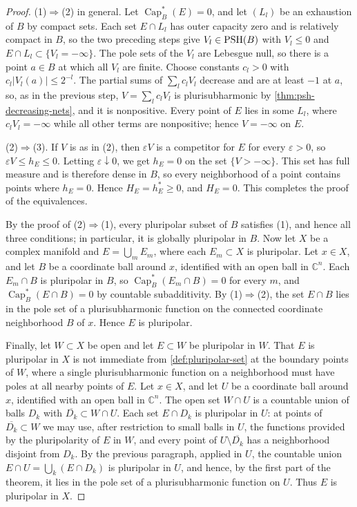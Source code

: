 \begin{proof}
(1)$\Rightarrow$(2) in general. Let $\operatorname{Cap}_B^*(E)=0$, and let $(L_l)$ be an exhaustion of $B$ by compact sets. Each set $E\cap L_l$ has outer capacity zero and is relatively compact in $B$, so the two preceding steps give $V_l\in\mathrm{PSH}(B)$ with $V_l\le0$ and $E\cap L_l\subset\{V_l=-\infty\}$. The pole sets of the $V_l$ are Lebesgue null, so there is a point $a\in B$ at which all $V_l$ are finite. Choose constants $c_l>0$ with $c_l|V_l(a)|\le2^{-l}$. The partial sums of $\sum_lc_lV_l$ decrease and are at least $-1$ at $a$, so, as in the previous step, $V=\sum_lc_lV_l$ is plurisubharmonic by \cref{thm:psh-decreasing-nets}, and it is nonpositive. Every point of $E$ lies in some $L_l$, where $c_lV_l=-\infty$ while all other terms are nonpositive; hence $V=-\infty$ on $E$.

(2)$\Rightarrow$(3). If $V$ is as in (2), then $\varepsilon V$ is a competitor for $E$ for every $\varepsilon>0$, so $\varepsilon V\le h_E\le0$. Letting $\varepsilon\downarrow0$, we get $h_E=0$ on the set $\{V>-\infty\}$. This set has full measure and is therefore dense in $B$, so every neighborhood of a point contains points where $h_E=0$. Hence $H_E=h_E^*\ge0$, and $H_E=0$. This completes the proof of the equivalences.

By the proof of (2)$\Rightarrow$(1), every pluripolar subset of $B$ satisfies (1), and hence all three conditions; in particular, it is globally pluripolar in $B$. Now let $X$ be a complex manifold and $E=\bigcup_mE_m$, where each $E_m\subset X$ is pluripolar. Let $x\in X$, and let $B$ be a coordinate ball around $x$, identified with an open ball in $\mathbb C^n$. Each $E_m\cap B$ is pluripolar in $B$, so $\operatorname{Cap}_B^*(E_m\cap B)=0$ for every $m$, and $\operatorname{Cap}_B^*(E\cap B)=0$ by countable subadditivity. By (1)$\Rightarrow$(2), the set $E\cap B$ lies in the pole set of a plurisubharmonic function on the connected coordinate neighborhood $B$ of $x$. Hence $E$ is pluripolar.

Finally, let $W\subset X$ be open and let $E\subset W$ be pluripolar in $W$. That $E$ is pluripolar in $X$ is not immediate from \cref{def:pluripolar-set} at the boundary points of $W$, where a single plurisubharmonic function on a neighborhood must have poles at all nearby points of $E$. Let $x\in X$, and let $U$ be a coordinate ball around $x$, identified with an open ball in $\mathbb C^n$. The open set $W\cap U$ is a countable union of balls $D_k$ with $\overline{D_k}\subset W\cap U$. Each set $E\cap D_k$ is pluripolar in $U$: at points of $\overline{D_k}\subset W$ we may use, after restriction to small balls in $U$, the functions provided by the pluripolarity of $E$ in $W$, and every point of $U\setminus\overline{D_k}$ has a neighborhood disjoint from $D_k$. By the previous paragraph, applied in $U$, the countable union $E\cap U=\bigcup_k(E\cap D_k)$ is pluripolar in $U$, and hence, by the first part of the theorem, it lies in the pole set of a plurisubharmonic function on $U$. Thus $E$ is pluripolar in $X$.
\end{proof}

